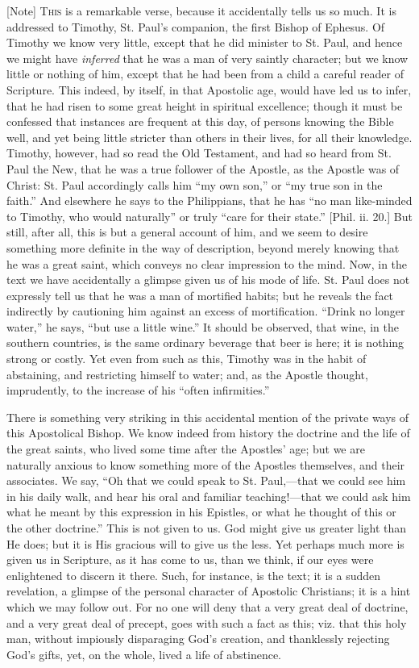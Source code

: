 [Note] T\textsc{his} is a remarkable verse,
because it accidentally tells us so much. It is addressed to Timothy,
St. Paul's companion, the first Bishop of Ephesus. Of Timothy we know
very little, except that he did minister to St. Paul, and hence we might
have \emph{inferred} that he was a man of very saintly character; but we
know little or nothing of him, except that he had been from a child a
careful reader of Scripture. This indeed, by itself, in that Apostolic
age, would have led us to infer, that he had risen to some great height
in spiritual excellence; though it must be confessed that instances are
frequent at this day, of persons knowing the Bible well, and yet being
little stricter than others in their lives, for all their knowledge.
Timothy, however, had so read the Old Testament, and had so heard from
St. Paul the New, that he was a true follower of the Apostle, as the
Apostle was of Christ: St. Paul accordingly calls him ``my own
son,'' or ``my true son in the faith.'' And elsewhere he
says to the Philippians, that he has ``no man like-minded to
Timothy, who would naturally'' or truly ``care for their
state.'' [Phil. ii. 20.] But still, after all, this is but a general
account of him, and we seem to desire something more definite in the way
of description, beyond merely knowing that he was a great saint, which
conveys no clear impression to the mind. Now, in the text we have
accidentally a glimpse given us of his mode of life. St. Paul does not
expressly tell us that he was a man of mortified habits; but he reveals
the fact indirectly by cautioning him against an excess of
mortification. ``Drink no longer water,'' he says, ``but use
a little wine.'' It should be observed, that wine, in the southern
countries, is the same ordinary beverage that beer is here; it is
nothing strong or costly. Yet even from such as this, Timothy was in the
habit of abstaining, and restricting himself to water; and, as the
Apostle thought, imprudently, to the increase of his ``often
infirmities.''

There is something very striking in this accidental mention of the
private ways of this Apostolical Bishop. We know indeed from history the
doctrine and the life of the great saints, who lived some time after the
Apostles' age; but we are naturally anxious to know something more of
the Apostles themselves, and their associates. We say, ``Oh that we
could speak to St. Paul,—that we could see him in his daily walk, and
hear his oral and familiar teaching!—that we could ask him what he
meant by this expression in his Epistles, or what he thought of this or
the other doctrine.'' This is not given to us. God might give us
greater light than He does; but it is His gracious will to give us the
less. Yet perhaps much more is given us in Scripture, as it has come to
us, than we think, if our eyes were enlightened to discern it there.
Such, for instance, is the text; it is a sudden revelation, a glimpse of
the personal character of Apostolic Christians; it is a hint which we
may follow out. For no one will deny that a very great deal of doctrine,
and a very great deal of precept, goes with such a fact as this; viz.
that this holy man, without impiously disparaging God's creation, and
thanklessly rejecting God's gifts, yet, on the whole, lived a life of
abstinence.

